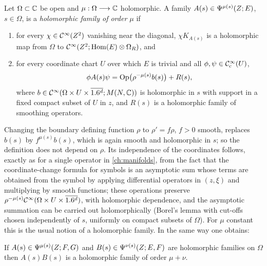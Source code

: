 \begin{definition}\label{eta:def:hol-family}
Let $\Omega\subset\mathbb{C}$ be open and $\mu:\Omega\longrightarrow\mathbb{C}$ holomorphic. A family
$A(s)\in\Psi^{\mu(s)}(Z;E)$, $s\in\Omega$, is a \emph{holomorphic family of order
$\mu$} if
\begin{enumerate}[label=(\roman*)]
\item for every $\chi\in\mathcal{C}^\infty(Z^2)$ vanishing near the diagonal, $\chi K_{A(s)}$ is a
holomorphic map from $\Omega$ to $\mathcal{C}^\infty(Z^2;\operatorname{Hom}(E)\otimes\Omega_R)$, and
\item for every coordinate chart $U$ over which $E$ is trivial and all
$\phi,\psi\in\mathcal{C}^\infty_{\mathrm{c}}(U)$,
\[
\phi A(s)\psi=\operatorname{Op}\bigl(\rho^{-\mu(s)}b(s)\bigr)+R(s),
\]
where $b\in\mathcal{C}^\infty(\Omega\times U\times\overline{1.6^d};M(N,\mathbb{C}))$ is holomorphic in $s$ with
support in a fixed compact subset of $U$ in $z$, and $R(s)$ is a holomorphic family
of smoothing operators.
\end{enumerate}
\end{definition}

Changing the boundary defining function $\rho$ to $\rho'=f\rho$, $f>0$ smooth, replaces
$b(s)$ by $f^{\mu(s)}b(s)$, which is again smooth and holomorphic in $s$; so the
definition does not depend on $\rho$. Its independence of the coordinates follows,
exactly as for a single operator in \cref{ch:manifolds}, from the fact that the
coordinate-change formula for symbols is an asymptotic sum whose terms are
obtained from the symbol by applying differential operators in $(z,\xi)$ and
multiplying by smooth functions; these operations preserve
$\rho^{-\mu(s)}\mathcal{C}^\infty(\Omega\times U\times\overline{1.6^d})$, with holomorphic dependence, and the
asymptotic summation can be carried out holomorphically (Borel's lemma with
cut-offs chosen independently of $s$, uniformly on compact subsets of $\Omega$). For
$\mu$ constant this is the usual notion of a holomorphic family. In the same way one
obtains:

\begin{lemma}\label{eta:lem:hol-composition}
If $A(s)\in\Psi^{\mu(s)}(Z;F,G)$ and $B(s)\in\Psi^{\nu(s)}(Z;E,F)$ are holomorphic
families on $\Omega$ then $A(s)B(s)$ is a holomorphic family of order $\mu+\nu$.
\end{lemma}

